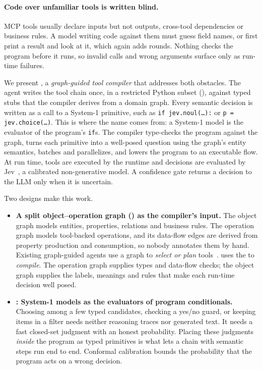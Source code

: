 \paragraph{Code over unfamiliar tools is written blind.} MCP tools usually declare inputs but not outputs, cross-tool dependencies or business rules. A model writing code against them must guess field names, or first print a result and look at it, which again adds rounds. Nothing checks the program before it runs, so invalid calls and wrong arguments surface only as run-time failures.

We present \jif, a \emph{graph-guided tool compiler} that addresses both obstacles. The agent writes the tool chain once, in a restricted Python subset (\pyif), against typed stubs that the compiler derives from a domain graph. Every semantic decision is written as a call to a System-1 primitive, such as \texttt{if jev.noul(\ldots):} or \texttt{p = jev.choice(\ldots)}. This is where the name comes from: a System-1 model is the evaluator of the program's \texttt{if}s. The compiler type-checks the program against the graph, turns each primitive into a well-posed question using the graph's entity semantics, batches and parallelizes, and lowers the program to an executable flow. At run time, tools are executed by the runtime and decisions are evaluated by Jev~\cite{typesafe2026jev}, a calibrated non-generative model. A confidence gate returns a decision to the LLM only when it is uncertain.

Two designs make this work.
\begin{itemize}
  \item \textbf{A split object--operation graph (\sog) as the compiler's input.} The object graph models entities, properties, relations and business rules. The operation graph models tool-backed operations, and its data-flow edges are derived from property production and consumption, so nobody annotates them by hand. Existing graph-guided agents use a graph to \emph{select or plan} tools~\cite{lee2026innout,navi2025,gap2025}. \jif uses the \sog to \emph{compile}. The operation graph supplies types and data-flow checks; the object graph supplies the labels, meanings and rules that make each run-time decision well posed.
  \item \textbf{\jif: System-1 models as the evaluators of program conditionals.} Choosing among a few typed candidates, checking a yes/no guard, or keeping items in a filter needs neither reasoning traces nor generated text. It needs a fast closed-set judgment with an honest probability. Placing these judgments \emph{inside} the program as typed primitives is what lets a chain with semantic steps run end to end. Conformal calibration bounds the probability that the program acts on a wrong decision.
\end{itemize}

